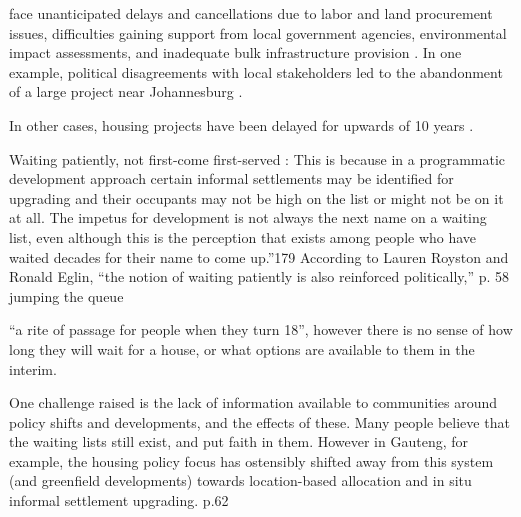 \documentclass[12pt]{article}
\begin{document}
face unanticipated delays and cancellations due to labor and land procurement issues, difficulties gaining support from local government agencies, environmental impact assessments, and inadequate bulk infrastructure provision \citep{dhsreports}.  In one example, political disagreements with local stakeholders led to the abandonment of a large project near Johannesburg \citep{protest}.  

In other cases, housing projects have been delayed for upwards of 10 years \citep{dagpl}. 

\citep{tissington2012towards}



Waiting patiently, not first-come first-served :  
This is because in a programmatic
development approach certain informal settlements may be identified for upgrading
and their occupants may not be high on the list or might not be on it at all. The impetus
for development is not always the next name on a waiting list, even although this is the
perception that exists among people who have waited decades for their name to come
up.”179 According to Lauren Royston and Ronald Eglin, “the notion of waiting patiently
is also reinforced politically,” p. 58 jumping the queue


“a rite of
passage for people when they turn 18”, however there is no sense of how long they will
wait for a house, or what options are available to them in the interim.


One challenge raised is the
lack of information available to communities around policy shifts and developments,
and the effects of these. Many people believe that the waiting lists still exist, and put
faith in them. However in Gauteng, for example, the housing policy focus has ostensibly
shifted away from this system (and greenfield developments) towards location-based
allocation and in situ informal settlement upgrading. p.62
\end{document}

